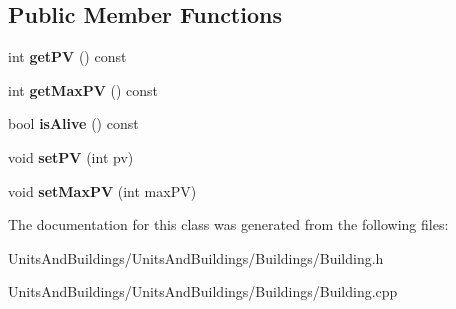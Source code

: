 \subsection*{Public Member Functions}
\begin{DoxyCompactItemize}
\item 
\mbox{\label{class_building_a268309a5f2e6f06eb3f6ff406e60d100}} 
int {\bfseries get\+PV} () const
\item 
\mbox{\label{class_building_a0209562df8663e05333ee6e0344cf868}} 
int {\bfseries get\+Max\+PV} () const
\item 
\mbox{\label{class_building_a23d76691c587dd11731521bc0ca4dbc5}} 
bool {\bfseries is\+Alive} () const
\item 
\mbox{\label{class_building_a6c3258a9511d53a5b188d5acc66dd9e5}} 
void {\bfseries set\+PV} (int pv)
\item 
\mbox{\label{class_building_a2950b3013873951b665bb1f8149a0718}} 
void {\bfseries set\+Max\+PV} (int max\+PV)
\end{DoxyCompactItemize}


The documentation for this class was generated from the following files\+:\begin{DoxyCompactItemize}
\item 
Units\+And\+Buildings/\+Units\+And\+Buildings/\+Buildings/Building.\+h\item 
Units\+And\+Buildings/\+Units\+And\+Buildings/\+Buildings/Building.\+cpp\end{DoxyCompactItemize}
